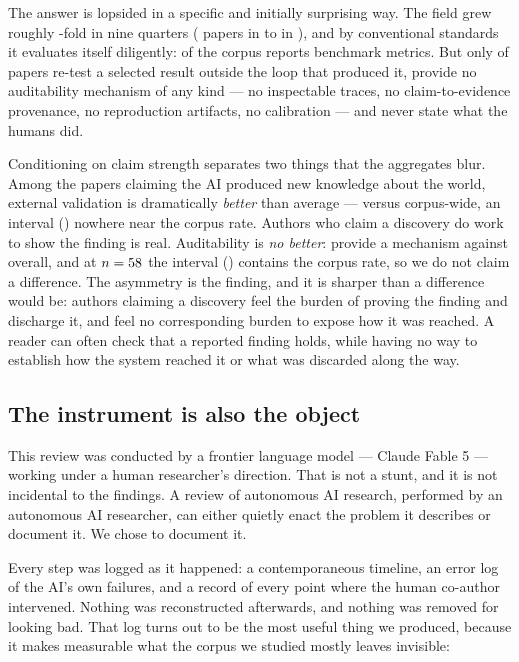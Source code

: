 The answer is lopsided in a specific and initially surprising way. The field grew roughly
\growthFactor{}-fold in nine quarters (\firstQn{} papers in \firstQ{} to \peakQn{} in
\peakQ{}), and by conventional standards it evaluates itself diligently: \pctBenchMetric{} of
the corpus reports benchmark metrics. But only \pctHeldOut{} of papers re-test a selected
result outside the loop that produced it, \pctAuditNone{} provide no auditability mechanism
of any kind --- no inspectable traces, no claim-to-evidence provenance, no reproduction
artifacts, no calibration --- and \pctHumanUnspec{} never state what the humans did.

Conditioning on claim strength separates two things that the aggregates blur. Among the
\nDiscovery{} papers claiming the AI produced new knowledge about the world, external
validation is dramatically \emph{better} than average --- \pctDiscRealWorld{} versus
\pctRealWorld{} corpus-wide, an interval (\ciDiscRealWorld{}) nowhere near the corpus rate.
Authors who claim a discovery do work to show the finding is real. Auditability is
\emph{no better}: \pctDiscAudit{} provide a mechanism against \pctAnyAudit{} overall, and at
$n=58{}$ the interval (\ciDiscAudit{}) contains the corpus rate, so we do not claim
a difference. The asymmetry is the finding, and it is sharper than a difference would be:
authors claiming a discovery feel the burden of proving the finding and discharge it, and
feel no corresponding burden to expose how it was reached. A reader can often check that a
reported finding holds, while having no way to establish how the system reached it or what
was discarded along the way.

\subsection*{The instrument is also the object}

This review was conducted by a frontier language model --- Claude Fable 5 --- working under
a human researcher's direction. That is not a stunt, and it is not incidental to the
findings. A review of autonomous AI research, performed by an autonomous AI researcher, can
either quietly enact the problem it describes or document it. We chose to document it.

Every step was logged as it happened: a contemporaneous timeline, an error log of the AI's
own failures, and a record of every point where the human co-author intervened. Nothing was
reconstructed afterwards, and nothing was removed for looking bad. That log turns out to be
the most useful thing we produced, because it makes measurable what the corpus we studied
mostly leaves invisible:

